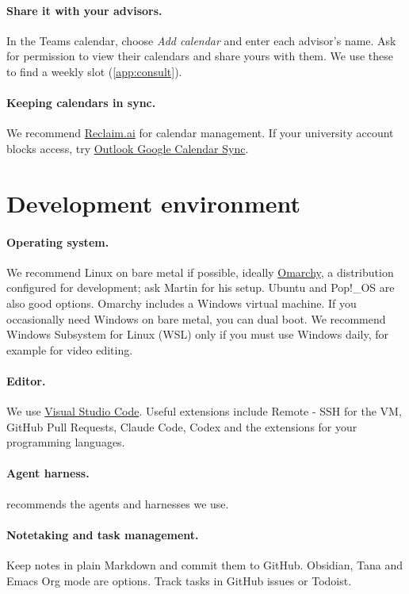 \paragraph{Share it with your advisors.} In the Teams calendar, choose \emph{Add calendar} and enter each advisor's name. Ask for permission to view their calendars and share yours with them. We use these to find a weekly slot (\cref{app:consult}).

\paragraph{Keeping calendars in sync.} We recommend \href{https://reclaim.ai/}{Reclaim.ai} for calendar management. If your university account blocks access, try \href{https://www.outlookgooglecalendarsync.com/}{Outlook Google Calendar Sync}.

\section{Development environment}\label{app:start:env}
\paragraph{Operating system.} We recommend Linux on bare metal if possible, ideally \href{https://omarchy.org/}{Omarchy}, a distribution configured for development; ask Martin for his setup. Ubuntu and Pop!\_OS are also good options. Omarchy includes a Windows virtual machine. If you occasionally need Windows on bare metal, you can dual boot. We recommend Windows Subsystem for Linux (WSL) only if you must use Windows daily, for example for video editing.

\paragraph{Editor.} We use \href{https://code.visualstudio.com/}{Visual Studio Code}. Useful extensions include Remote - SSH for the VM, GitHub Pull Requests, Claude Code, Codex and the extensions for your programming languages.

\paragraph{Agent harness.}  recommends the agents and harnesses we use.

\paragraph{Notetaking and task management.} Keep notes in plain Markdown and commit them to GitHub. Obsidian, Tana and Emacs Org mode are options. Track tasks in GitHub issues or Todoist.

